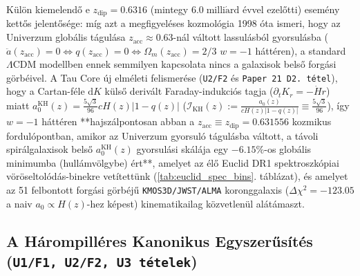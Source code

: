 \documentclass[11pt,a4paper]{article}
\begin{document}
Külön kiemelendő e $z_{\mathrm{dip}} = 0.6316$ (mintegy $6.0\;\mathrm{milli\acute{a}rd}$ évvel ezelőtti) esemény kettős jelentősége: míg azt a megfigyeléses kozmológia 1998 óta ismeri, hogy az Univerzum globális tágulása $z_{\mathrm{acc}} \approx 0.63$-nál váltott lassulásból gyorsulásba ($\ddot{a}(z_{\mathrm{acc}}) = 0 \iff q(z_{\mathrm{acc}}) = 0 \iff \Omega_m(z_{\mathrm{acc}}) = 2/3$ $w=-1$ háttéren), a standard $\Lambda\mathrm{CDM}$ modellben ennek semmilyen kapcsolata nincs a galaxisok belső forgási görbéivel. A Tau Core új elméleti felismerése (\texttt{U2/F2} és \texttt{Paper 21 D2.\ tétel}), hogy a Cartan-féle $\mathrm{d}K$ külső derivált Faraday-indukciós tagja ($\partial_t K_r = -\dot{H}r$) miatt $a_0^{\mathrm{KH}}(z) = \frac{5\sqrt{3}}{96}cH(z)|1 - q(z)|$ ($\mathcal{I}_{\mathrm{KH}}(z) := \frac{a_0(z)}{cH(z)|1-q(z)|} \equiv \frac{5\sqrt{3}}{96}$), így $w = -1$ háttéren **hajszálpontosan abban a $z_{\mathrm{acc}} \equiv z_{\mathrm{dip}} = 0.631556$ kozmikus fordulópontban, amikor az Univerzum gyorsuló tágulásba váltott, a távoli spirálgalaxisok belső $a_0^{\mathrm{KH}}(z)$ gyorsulási skálája egy $-6.15\%$-os globális minimumba (hullámvölgybe) ért**, amelyet az élő Euclid DR1 spektroszkópiai vöröseltolódás-binekre vetítettünk (\ref{tab:euclid_spec_bins}. táblázat), és amelyet az 51 felbontott forgási görbéjű \texttt{KMOS3D/JWST/ALMA} koronggalaxis ($\Delta\chi^2 = -123.05$ a naiv $a_0\propto H(z)$-hez képest) kinematikailag közvetlenül alátámaszt.

\subsection{A Hárompilléres Kanonikus Egyszerűsítés (\texorpdfstring{\texttt{U1/F1, U2/F2, U3 tételek}}{U1/F1, U2/F2, U3 tetelek})}
\end{document}
